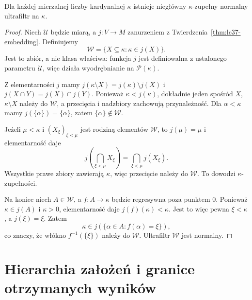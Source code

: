 \begin{twierdzenie}
\label{thm:lc37-normal-exists}
Dla każdej mierzalnej liczby kardynalnej
$\kappa$ istnieje niegłówny
$\kappa$-zupełny normalny ultrafiltr
na $\kappa$.
\end{twierdzenie}
\begin{proof}
Niech $\mathcal U$ będzie miarą,
a $j:V\to M$ zanurzeniem z
Twierdzenia~\ref{thm:lc37-embedding}.
Definiujemy
\[
 \mathcal W=\{X\subseteq\kappa:
                  \kappa\in j(X)\}.
\]
Jest to zbiór, a nie klasa
właściwa: funkcja $j$ jest
definiowalna z ustalonego parametru
$\mathcal U$, więc działa
wyodrębnianie na $\mathcal P(\kappa)$.

Z elementarności $j$ mamy
$j(\kappa\setminus X)
 =j(\kappa)\setminus j(X)$
i $j(X\cap Y)=j(X)\cap j(Y)$.
Ponieważ $\kappa<j(\kappa)$,
dokładnie jeden spośród $X$,
$\kappa\setminus X$ należy do
$\mathcal W$, a przecięcia i
nadzbiory zachowują przynależność.
Dla $\alpha<\kappa$ mamy
$j(\{\alpha\})=\{\alpha\}$,
zatem $\{\alpha\}\notin\mathcal W$.

Jeżeli $\mu<\kappa$ i
$(X_\xi)_{\xi<\mu}$ jest rodziną
elementów $\mathcal W$, to
$j(\mu)=\mu$ i elementarność
daje
\[
 j\left(\bigcap_{\xi<\mu}X_\xi\right)
  =\bigcap_{\xi<\mu}j(X_\xi).
\]
Wszystkie prawe zbiory zawierają
$\kappa$, więc przecięcie
należy do $\mathcal W$.
To dowodzi $\kappa$-zupełności.

Na koniec niech $A\in\mathcal W$,
a $f:A\to\kappa$ będzie regresywna
poza punktem $0$.
Ponieważ $\kappa\in j(A)$ i
$\kappa>0$, elementarność daje
$j(f)(\kappa)<\kappa$.
Jest to więc pewna
$\xi<\kappa$, a $j(\xi)=\xi$.
Zatem
\[
 \kappa\in j(\{\alpha\in A:
                          f(\alpha)=\xi\}),
\]
co znaczy, że włókno
$f^{-1}(\{\xi\})$ należy do
$\mathcal W$. Ultrafiltr
$\mathcal W$ jest normalny.
\end{proof}

\section{Hierarchia założeń i granice otrzymanych wyników}


